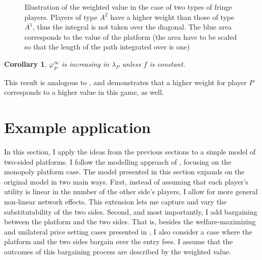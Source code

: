 \documentclass[a4paper]{article}
\newtheorem{corollary}{Corollary}
\begin{document}
\begin{figure}
    \centering
    \caption{Illustration of the weighted value in the case of two types of fringe players. Players of type $A^2$ have a higher weight than those of type $A^1$, thus the integral is not taken over the diagonal. The blue area corresponds to the value of the platform (the area have to be scaled so that the length of the path integrated over is one)}
    \label{fig:many_sided_weighted}
\end{figure}

\begin{corollary}
    \label{cor:platform_value_multiple_sides_weighted}
    $\varphi_P^\infty$ is increasing in $\lambda_P$ unless $f$ is constant.
\end{corollary}
This result is analogous to , and demonstrates that a higher weight for player $P$ corresponds to a higher value in this game, as well.

\section{Example application}
\label{sec:application}

In this section, I apply the ideas from the previous sections to a simple model of two-sided platforms.
I follow the modelling approach of \textcite{armstrong2006competition}, focusing on the monopoly platform case.
The model presented in this section expands on the original model in two main ways.
First, instead of assuming that each player's utility is linear in the number of the other side's players, I allow for more general non-linear network effects. 
This extension lets me capture and vary the substitutability of the two sides.
Second, and most importantly, I add bargaining between the platform and the two sides.
That is, besides the welfare-maximizing and unilateral price setting cases presented in \textcite{armstrong2006competition}, I also consider a case where the platform and the two sides bargain over the entry fees.
I assume that the outcomes of this bargaining process are described by the weighted value.
\end{document}

